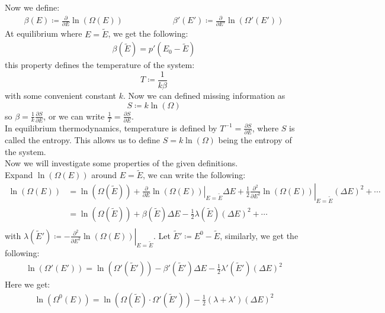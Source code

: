 \documentclass[11pt,oneside]{book}
\theoremstyle{break}
\theoremstyle{break}
\begin{document}
Now we define:
\begin{align*}
\beta(E) \coloneqq \frac{\partial}{\partial E}\ln (\Omega(E))\qquad\qquad\qquad\beta'(E') \coloneqq \frac{\partial}{\partial E'}\ln (\Omega'(E'))
\end{align*}
At equilibrium where $E = \widetilde{E}$, we get the following:
\begin{align*}
\beta(\widetilde{E}) = p'(E_0-\widetilde{E})
\end{align*}
this property defines the temperature of the system:
$$T \coloneqq \frac{1}{k\beta}$$
with some convenient constant $k$. Now we can defined missing information as $$S \coloneqq k\ln(\Omega)$$ 
so $\beta = \frac{1}{k}\frac{\partial S}{\partial E}$, or we can write $\frac{1}{T} = \frac{\partial S}{\partial E}$. \\


In equilibrium thermodynamics, temperature is defined by $T^{-1} =\frac{\partial S}{\partial E}$, where $S$ is called the entropy. This allows us to define $S =k\ln(\Omega)$ being the entropy of the system. \\

Now we will investigate some properties of the given definitions. \\
Expand $\ln(\Omega(E))$ around $E = \widetilde{E}$, we can write the following:
\begin{align*}
\ln(\Omega(E)) &= \ln(\Omega(\widetilde{E})) + \left.\frac{\partial}{\partial E}\ln(\Omega(E))\right|_{E=\widetilde{E}} \Delta E + \left.\frac{1}{2}\frac{\partial^2}{\partial E^2}\ln(\Omega(E))\right|_{E=\widetilde{E}} (\Delta E)^2 + \cdots \\
&= \ln(\Omega(\widetilde{E})) + \beta(\widetilde{E}) \Delta E - \frac{1}{2}\lambda(\widetilde{E})(\Delta E)^2 + \cdots\\
\end{align*}
with $\lambda(\widetilde{E}') \coloneqq -\left.\frac{\partial^2}{\partial E^2}\ln(\Omega(E)) \right|_{E = \widetilde{E}}$. Let $\widetilde{E}'\coloneqq E^0 - \widetilde{E}$, similarly, we get the following:
\begin{align*}
\ln(\Omega'(E')) = \ln(\Omega'(\widetilde{E}')) - \beta'(\widetilde{E}') \Delta E - \frac{1}{2}\lambda'(\widetilde{E}') (\Delta E)^2
\end{align*}
Here we get:
\begin{align*}
\ln(\Omega^0(E)) = \ln(\Omega(\widetilde{E})\cdot \Omega'(\widetilde{E}')) - \frac{1}{2}(\lambda+\lambda') (\Delta E)^2
\end{align*}
\end{document}
